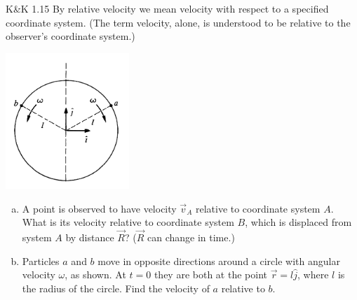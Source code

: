 \documentclass{esg8012pset}
\begin{document}
\begin{problem}{K\&K 1.15}
  By relative velocity we mean velocity with respect to a specified coordinate system. (The term
  velocity, alone, is understood to be relative to the observer's coordinate system.)
  \begin{center}\includegraphics[width=0.35\textwidth]{ps01_2}\end{center}
  \begin{enumerate}[a.]
    \item A point is observed to have velocity $\vec v_A$ relative to coordinate system $A$. What is its
  velocity relative to coordinate system $B$, which is displaced from system $A$ by distance $\vec R$? ($\vec R$ can change in time.)
    \item Particles $a$ and $b$ move in opposite directions around a circle with angular velocity $\omega$,
  as shown. At $t = 0$ they are both at the point $\vec r = l\hat j$, where $l$ is the radius of the circle.
  Find the velocity of $a$ relative to $b$.
  \end{enumerate}
\end{problem}
\end{document}
